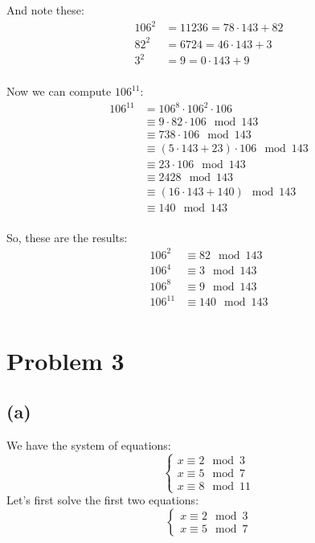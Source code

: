 \documentclass{article}
\begin{document}
And note these:
\begin{align*}
   106^2 &= 11236 = 78 \cdot 143 + 82 \\
   82^2 &= 6724 = 46 \cdot 143 + 3 \\
   3^2 &= 9 = 0 \cdot 143 + 9 \\
\end{align*}

Now we can compute \(106^{11}\):
\begin{align*}
   106^{11} &= 106^8 \cdot 106^2 \cdot 106 \\
   &\equiv 9 \cdot 82 \cdot 106 \mod 143 \\
   &\equiv 738 \cdot 106 \mod 143 \\
   &\equiv (5 \cdot 143 + 23) \cdot 106 \mod 143 \\
   &\equiv 23 \cdot 106 \mod 143 \\
   &\equiv 2428 \mod 143 \\
   &\equiv (16 \cdot 143 + 140) \mod 143 \\
   &\equiv 140 \mod 143 \\
\end{align*}

So, these are the results:
\begin{align*}
   106^2 &\equiv 82 \mod 143 \\
   106^4 &\equiv 3 \mod 143 \\
   106^8 &\equiv 9 \mod 143 \\
   106^{11} &\equiv 140 \mod 143 \\
\end{align*}

\section*{Problem 3}


\subsection*{(a)}
We have the system of equations:
\[
   \begin{cases}
      x \equiv 2 \mod 3 \\
      x \equiv 5 \mod 7 \\
      x \equiv 8 \mod 11
   \end{cases}
\]
Let's first solve the first two equations:
\[
   \begin{cases}
      x \equiv 2 \mod 3 \\
      x \equiv 5 \mod 7
   \end{cases}
\]
\end{document}
